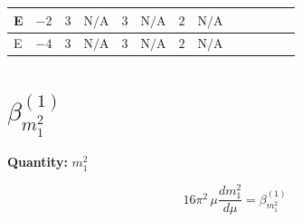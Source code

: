 \documentclass[8pt]{article}
\begin{document}
\begin{landscape}
\begin{longtable}{@{}llcccccc >{\raggedright\arraybackslash}p{0.21\linewidth} >{\raggedright\arraybackslash}p{0.21\linewidth} >{\raggedright\arraybackslash}p{0.21\linewidth}@{}}
\midrule
E & $-2$ & $3$ & $\text{N/A}$ & $3$ & $\text{N/A}$ & $2$ & $\text{N/A}$ & \scriptsize\adjustbox{max width=\linewidth}{$\begin{gathered} +\frac{3}{2} \left({Y_e}\,\left({Y_e}\right)^{\dagger}\,{Y_e}\right)_{ij}\end{gathered}$} & \scriptsize\adjustbox{max width=\linewidth}{$\begin{gathered} -\frac{9}{4} {g_2}^2 \left({Y_e}\right)_{ij}\end{gathered}$} & \scriptsize\adjustbox{max width=\linewidth}{$\begin{gathered} -\frac{15}{4} {g_1}^2 \left({Y_e}\right)_{ij}\end{gathered}$} \\
\midrule
E & $-4$ & $3$ & $\text{N/A}$ & $3$ & $\text{N/A}$ & $2$ & $\text{N/A}$ & \scriptsize\adjustbox{max width=\linewidth}{$\begin{gathered} +\frac{3}{2} \left({Y_e}\,\left({Y_e}\right)^{\dagger}\,{Y_e}\right)_{ij}\end{gathered}$} & \scriptsize\adjustbox{max width=\linewidth}{$\begin{gathered} -\frac{9}{4} {g_2}^2 \left({Y_e}\right)_{ij}\end{gathered}$} & \scriptsize\adjustbox{max width=\linewidth}{$\begin{gathered} -\frac{15}{4} {g_1}^2 \left({Y_e}\right)_{ij}\end{gathered}$} \\
\midrule
\bottomrule
\end{longtable}
\clearpage
\section*{$\beta_{m_1^2}^{(1)}$}
\noindent\textbf{Quantity: }$m_1^2$\par\smallskip
\[16\pi^2\,\mu\frac{d m_1^2}{d\mu}=\beta_{m_1^2}^{(1)}\]

\end{landscape}
\end{document}

